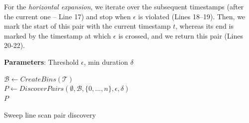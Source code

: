 For the \textit{horizontal expansion}, we iterate over the subsequent timestamps (after the current one -- Line 17) and stop when $\epsilon$ is violated (Lines 18--19). Then, we mark the start of this pair with the current timestamp $t$, whereas its end is marked by the timestamp at which $\epsilon$ is crossed, and we return this pair (Lines 20-22).


\setlength{\textfloatsep}{4pt}
\begin{algorithm}[tb]
    \DontPrintSemicolon
    \begin{footnotesize}
    \nonl \textbf{Parameters}: Threshold $\epsilon$, min duration $\delta$ \\
    \vspace{4pt}
    
    
    $\mathcal{B} \leftarrow CreateBins(\mathcal{T})$ \\
    $P \leftarrow DiscoverPairs(\emptyset, \mathcal{B}, \{0, ..., n\}, \epsilon, \delta)$ \\
    \KwRet $P$
    
    \vspace{4pt}
    
    \vspace{4pt}
    \end{footnotesize}
    \caption{Sweep line scan pair discovery}
    \label{alg:simple_scan_sim}
\end{algorithm}

